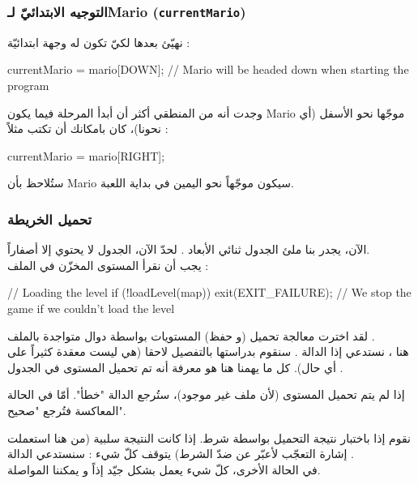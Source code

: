 \subsubsection{التوجيه الابتدائيّ لـ\textenglish{Mario} (\texttt{currentMario})}

نهيّئ بعدها
لكيّ تكون له وجهة ابتدائيّة :
\begin{Csource}
currentMario = mario[DOWN]; // Mario will be headed down when starting the program
\end{Csource}

وجدت أنه من المنطقي أكثر أن أبدأ المرحلة فيما يكون
\textenglish{Mario}
موجّها نحو الأسفل (أي نحونا)، كان بامكانك أن تكتب مثلاً :

\begin{Csource}
currentMario = mario[RIGHT];
\end{Csource}

ستُلاحظ بأن
\textenglish{Mario}
سيكون موجّهاً نحو اليمين في بداية اللعبة.

\subsubsection{تحميل الخريطة}

الآن، يجدر بنا ملئ الجدول ثنائي الأبعاد
.
لحدّ الآن، الجدول لا يحتوي إلا أصفاراً.\\
يجب أن نقرأ المستوى المخزّن في الملف
 :

\begin{Csource}
// Loading the level
if (!loadLevel(map))
	exit(EXIT_FAILURE); // We stop the game if we couldn't load the level
\end{Csource}

لقد اخترت معالجة تحميل (و حفظ) المستويات بواسطة دوال متواجدة بالملف
.\\
هنا ، نستدعي إذا الدالة
.
سنقوم بدراستها بالتفصيل لاحقا (هي ليست معقدة كثيراً على أي حال). كل ما يهمنا هنا هو معرفة أنه تم تحميل المستوى في الجدول
.

\begin{critical}
إذا لم يتم تحميل المستوى (لأن ملف
غير موجود)، ستُرجع الدالة "خطأ". أمّا في الحالة المعاكسة فتُرجع "صحيح".
\end{critical}

نقوم إذا باختبار نتيجة التحميل بواسطة شرط. إذا كانت النتيجة سلبية (من هنا استعملت إشارة التعجّب لأعبّر عن ضدّ الشرط) يتوقف كلّ شيء : سنستدعي الدالة
.\\
في الحالة الأخرى، كلّ شيء يعمل بشكل جيّد إذاً و يمكننا المواصلة.


